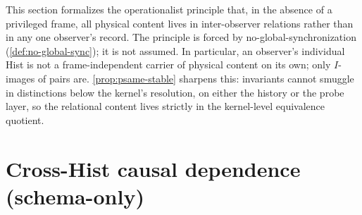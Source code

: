 \begin{remark}
\label{rem:relational-content}
This section formalizes the operationalist principle that, in the absence of a privileged frame, all physical content lives in inter-observer relations rather than in any one observer's record. The principle is forced by no-global-synchronization (\autoref{def:no-global-sync}); it is not assumed. In particular, an observer's individual Hist is not a frame-independent carrier of physical content on its own; only \(I\)-images of pairs are. \autoref{prop:psame-stable} sharpens this: invariants cannot smuggle in distinctions below the kernel's resolution, on either the history or the probe layer, so the relational content lives strictly in the kernel-level equivalence quotient.
\end{remark}

\section{Cross-Hist causal dependence (schema-only)}
\label{sec:cross-hist-causal}

